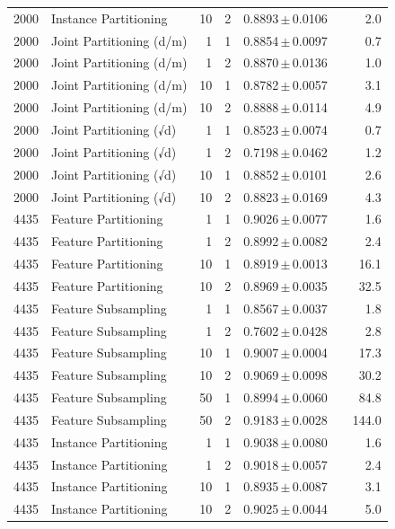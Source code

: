 \begin{table}[ht]
\begin{tabular}{rlrrccr}
2000 & Instance Partitioning & 10 & 2 & 0.8893\,$\pm$\,0.0106 &  & 2.0 \\
2000 & Joint Partitioning (d/m) & 1 & 1 & 0.8854\,$\pm$\,0.0097 &  & 0.7 \\
2000 & Joint Partitioning (d/m) & 1 & 2 & 0.8870\,$\pm$\,0.0136 &  & 1.0 \\
2000 & Joint Partitioning (d/m) & 10 & 1 & 0.8782\,$\pm$\,0.0057 &  & 3.1 \\
2000 & Joint Partitioning (d/m) & 10 & 2 & 0.8888\,$\pm$\,0.0114 &  & 4.9 \\
2000 & Joint Partitioning (√d) & 1 & 1 & 0.8523\,$\pm$\,0.0074 &  & 0.7 \\
2000 & Joint Partitioning (√d) & 1 & 2 & 0.7198\,$\pm$\,0.0462 &  & 1.2 \\
2000 & Joint Partitioning (√d) & 10 & 1 & 0.8852\,$\pm$\,0.0101 &  & 2.6 \\
2000 & Joint Partitioning (√d) & 10 & 2 & 0.8823\,$\pm$\,0.0169 &  & 4.3 \\
4435 & Feature Partitioning & 1 & 1 & 0.9026\,$\pm$\,0.0077 &  & 1.6 \\
4435 & Feature Partitioning & 1 & 2 & 0.8992\,$\pm$\,0.0082 &  & 2.4 \\
4435 & Feature Partitioning & 10 & 1 & 0.8919\,$\pm$\,0.0013 &  & 16.1 \\
4435 & Feature Partitioning & 10 & 2 & 0.8969\,$\pm$\,0.0035 &  & 32.5 \\
4435 & Feature Subsampling & 1 & 1 & 0.8567\,$\pm$\,0.0037 &  & 1.8 \\
4435 & Feature Subsampling & 1 & 2 & 0.7602\,$\pm$\,0.0428 &  & 2.8 \\
4435 & Feature Subsampling & 10 & 1 & 0.9007\,$\pm$\,0.0004 &  & 17.3 \\
4435 & Feature Subsampling & 10 & 2 & 0.9069\,$\pm$\,0.0098 &  & 30.2 \\
4435 & Feature Subsampling & 50 & 1 & 0.8994\,$\pm$\,0.0060 &  & 84.8 \\
4435 & Feature Subsampling & 50 & 2 & 0.9183\,$\pm$\,0.0028 &  & 144.0 \\
4435 & Instance Partitioning & 1 & 1 & 0.9038\,$\pm$\,0.0080 &  & 1.6 \\
4435 & Instance Partitioning & 1 & 2 & 0.9018\,$\pm$\,0.0057 &  & 2.4 \\
4435 & Instance Partitioning & 10 & 1 & 0.8935\,$\pm$\,0.0087 &  & 3.1 \\
4435 & Instance Partitioning & 10 & 2 & 0.9025\,$\pm$\,0.0044 &  & 5.0 \\

\end{tabular}
\end{table}
